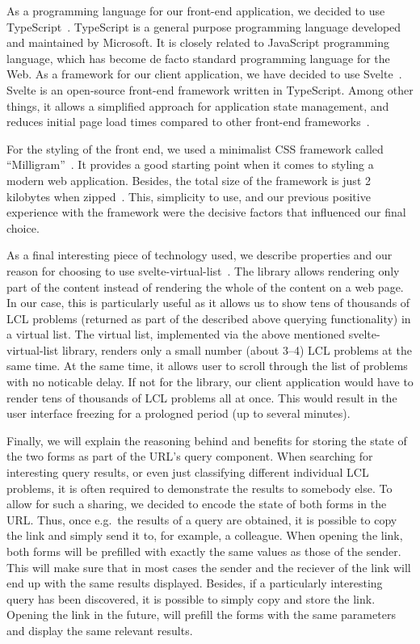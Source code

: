As a programming language for our front-end application, we decided
to use TypeScript~\cite{TypeScript}. TypeScript is a general purpose
programming language developed and maintained by Microsoft. It is closely related to JavaScript programming language, which has become de facto standard programming language for the Web.
As a framework for our client application, we have decided to use
Svelte~\cite{Svelte}. Svelte is an open-source front-end framework
written in TypeScript. Among other things, it allows a simplified
approach for application state management, and reduces initial
page load times compared to other front-end frameworks~\cite{SvelteVsReactBundleSize}.

For the styling of the front end, we used a minimalist CSS framework
called ``Milligram''~\cite{Milligram}. It provides a good starting point
when it comes to styling a modern web application. Besides, the total
size of the framework is just 2 kilobytes when zipped~\cite{Milligram}.
This, simplicity to use, and our previous positive experience with
the framework were the decisive factors that influenced our final
choice.

As a final interesting piece of technology used, we describe properties
and our reason for choosing to use svelte-virtual-list~\cite{svelte-virtual-list}.
The library allows rendering only part of the content instead of rendering
the whole of the content on a web page. In our case, this is
particularly useful as it allows us to
show tens of thousands of LCL problems (returned as part of the described above querying functionality) in a virtual list.
The virtual list, implemented via the above mentioned svelte-virtual-list library, renders only a small number (about 3--4)
LCL problems at the same time. At the same time, it allows user to
scroll through the list of problems with no noticable delay.
If not for the library, our client application would have to render
tens of thousands of LCL problems all at once. This would result in
the user interface freezing for a prologned period (up to several minutes).

Finally, we will explain the reasoning behind and benefits for
storing the state of the two forms as part of the URL's query
component. When searching for interesting query results, or even
just classifying different individual LCL problems, it is often
required to demonstrate the results to somebody else. To allow for such
a sharing, we decided to encode the state of both forms in the URL.
Thus, once e.g.\ the results of a query are obtained, it is possible
to copy the link and simply send it to, for example, a colleague.
When opening the link, both forms will be prefilled with
exactly the same values as those of the sender. This will make sure
that in most cases the sender and the reciever of the link will end
up with the same results displayed. Besides, if a particularly
interesting query has been discovered, it is possible to
simply copy and store the link. Opening the link in the future,
will prefill the forms with the same parameters and display
the same relevant results.


